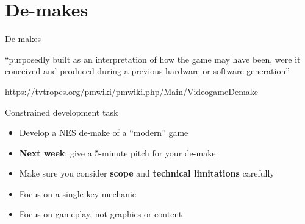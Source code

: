 \part{De-makes}
\frame{\partpage}

\begin{frame}{De-makes}
    \begin{center}
        ``purposedly built as an interpretation of how the game may have been, were it conceived and produced during a previous hardware or software generation''
        
        \vspace{2ex}
        
        \scriptsize{\url{https://tvtropes.org/pmwiki/pmwiki.php/Main/VideogameDemake}}
    \end{center}
\end{frame}

\begin{frame}{Constrained development task}
    \begin{itemize}
        \pause\item Develop a NES de-make of a ``modern'' game
	    \pause\item \textbf{Next week}: give a 5-minute pitch for your de-make
		\pause\item Make sure you consider \textbf{scope} and \textbf{technical limitations} carefully
		\pause\item Focus on a single key mechanic
		\pause\item Focus on gameplay, not graphics or content
	\end{itemize}
\end{frame}

